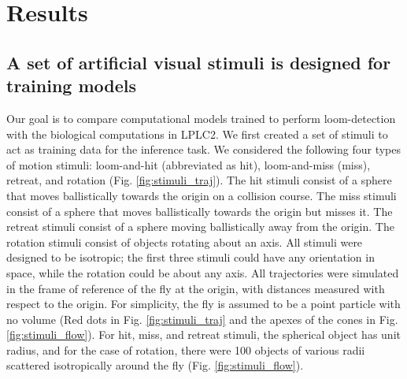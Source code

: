 \documentclass[pdftex,9pt,lineno]{elife}
\begin{document}
\section{Results}

\subsection{A set of artificial visual stimuli is designed for training models}





Our goal is to compare computational models trained to perform loom-detection with the biological computations in LPLC2. We first created a set of stimuli to act as training data for the inference task. We considered the following four types of motion stimuli: loom-and-hit (abbreviated as hit), loom-and-miss (miss), retreat, and rotation (Fig. \ref{fig:stimuli_traj}). The hit stimuli consist of a sphere that moves ballistically towards the origin on a collision course. The miss stimuli consist of a sphere that moves ballistically towards the origin but misses it. The retreat stimuli consist of a sphere moving ballistically away from the origin. The rotation stimuli consist of objects rotating about an axis. All stimuli were designed to be isotropic; the first three stimuli could have any orientation in space, while the rotation could be about any axis. All trajectories were simulated in the frame of reference of the fly at the origin, with distances measured with respect to the origin. For simplicity, the fly is assumed to be a point particle with no volume (Red dots in Fig. \ref{fig:stimuli_traj} and the apexes of the cones in Fig. \ref{fig:stimuli_flow}). For hit, miss, and retreat stimuli, the spherical object has unit radius, and for the case of rotation, there were 100 objects of various radii scattered isotropically around the fly (Fig. \ref{fig:stimuli_flow}).

\end{document}
